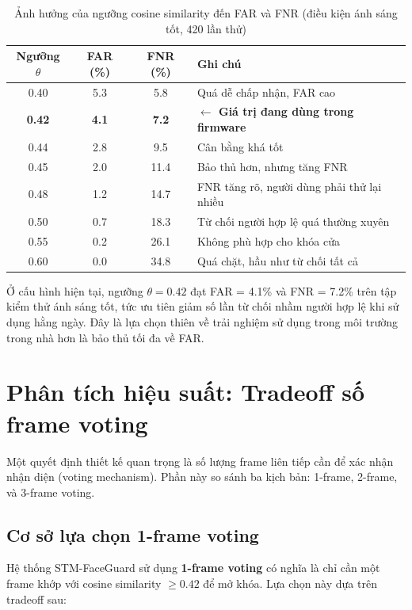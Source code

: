 \begin{table}[H]
  \centering
  \caption{Ảnh hưởng của ngưỡng cosine similarity đến FAR và FNR (điều kiện ánh sáng tốt, 420 lần thử)}
  \label{tab:threshold_sweep}
  \begin{tabularx}{0.95\textwidth}{c c c X}
    \toprule
    \textbf{Ngưỡng $\theta$} & \textbf{FAR (\%)} & \textbf{FNR (\%)} & \textbf{Ghi chú} \\
    \midrule
    0.40 & 5.3 & 5.8  & Quá dễ chấp nhận, FAR cao \\
    \textbf{0.42} & \textbf{4.1} & \textbf{7.2}  & \textbf{$\leftarrow$ Giá trị đang dùng trong firmware} \\
    0.44 & 2.8 & 9.5  & Cân bằng khá tốt \\
    0.45 & 2.0 & 11.4 & Bảo thủ hơn, nhưng tăng FNR \\
    0.48 & 1.2 & 14.7 & FNR tăng rõ, người dùng phải thử lại nhiều \\
    0.50 & 0.7 & 18.3 & Từ chối người hợp lệ quá thường xuyên \\
    0.55 & 0.2 & 26.1 & Không phù hợp cho khóa cửa \\
    0.60 & 0.0 & 34.8 & Quá chặt, hầu như từ chối tất cả \\
    \bottomrule
  \end{tabularx}
\end{table}

\noindent Ở cấu hình hiện tại, ngưỡng $\theta = 0.42$ đạt FAR = 4.1\% và FNR = 7.2\% trên tập kiểm thử ánh sáng tốt, tức ưu tiên giảm số lần từ chối nhầm người hợp lệ khi sử dụng hằng ngày. Đây là lựa chọn thiên về trải nghiệm sử dụng trong môi trường trong nhà hơn là bảo thủ tối đa về FAR.

\section{Phân tích hiệu suất: Tradeoff số frame voting}
\label{sec:voting_tradeoff}

Một quyết định thiết kế quan trọng là số lượng frame liên tiếp cần để xác nhận nhận diện (voting mechanism). Phần này so sánh ba kịch bản: 1-frame, 2-frame, và 3-frame voting.

\subsection{Cơ sở lựa chọn 1-frame voting}

Hệ thống STM-FaceGuard sử dụng \textbf{1-frame voting} có nghĩa là chỉ cần một frame khớp với cosine similarity $\geq 0.42$ để mở khóa. Lựa chọn này dựa trên tradeoff sau:

